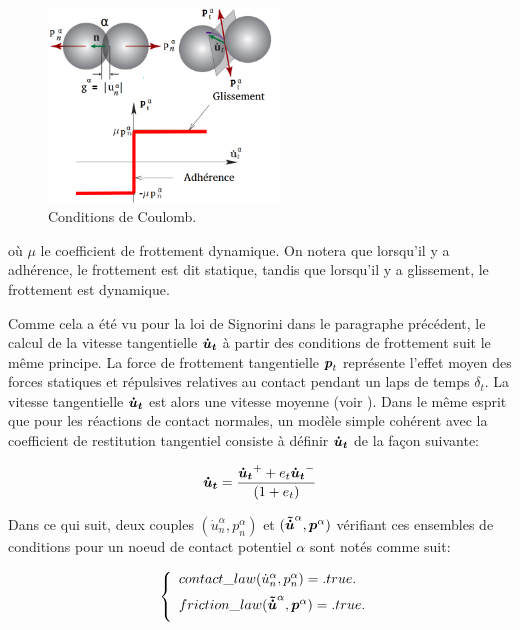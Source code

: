 \begin{figure}[!h]
  \centering
    \includegraphics[width=0.55\textwidth]{chapitres/chapitre_3/figures/loi_frottement_coulomb.png}
    \caption{\centering Conditions de Coulomb.}\label{fig4}
\end{figure}

\noindent où $\mu$ le coefficient de frottement dynamique. On notera que lorsqu'il y a adhérence, le frottement est dit statique, tandis que lorsqu'il y a glissement, le frottement est dynamique.

Comme cela a été vu pour la loi de Signorini dans le paragraphe précédent, le calcul de la vitesse tangentielle $\boldsymbol{\dot{u}_t}$ à partir des conditions de frottement suit le même principe. La force de frottement tangentielle $\boldsymbol{p}_t$ représente l'effet moyen des forces statiques et répulsives relatives au contact pendant un laps de temps $\delta_t$. La vitesse tangentielle $\boldsymbol{\dot{u}_t}$ est alors une vitesse moyenne (voir \cite{radjai2009contact}). Dans le même esprit que pour les réactions de contact normales, un modèle simple cohérent avec la coefficient de restitution tangentiel consiste à définir $\boldsymbol{\dot{u}_t}$ de la façon suivante:

\begin{equation}
\boldsymbol{\dot{u}_t} = \frac{\boldsymbol{\dot{u}_t}^{+} + e_t \boldsymbol{\dot{u}_t}^{-}}{(1+e_t)}
\label{8}
\end{equation}

Dans ce qui suit, deux couples $(\dot{u}_{n}^{\alpha},p_{n}^{\alpha})$ et $(\boldsymbol{\tilde{\dot{u}}}^{\alpha},\boldsymbol{p}^{\alpha})$ vérifiant ces ensembles de conditions pour un noeud de contact potentiel $\alpha$ sont notés comme suit:

\begin{eqnarray}
&& \left\{\begin{array}{lll}
contact\_law(\dot{u}_{n}^{\alpha},p_{n}^{\alpha}) = .true.\\[2mm]
friction\_law(\boldsymbol{\tilde{\dot{u}}}^{\alpha},\boldsymbol{p}^{\alpha}) = .true.\\[2mm]
\end{array}\right.
\label{unifriclaw}
\end{eqnarray}

